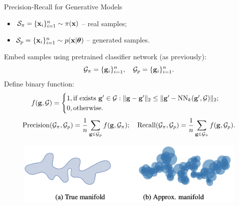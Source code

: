 \begin{frame}{Precision-Recall for Generative Models}
	\begin{itemize}
		\item $\mathcal{S}_{\pi} = \{\mathbf{x}_i\}_{i=1}^{n} \sim \pi(\mathbf{x})$ -- real samples;
		\item $\mathcal{S}_{p} = \{\mathbf{x}_i\}_{i=1}^{n} \sim p(\mathbf{x} | \boldsymbol{\theta})$ -- generated samples.
	\end{itemize}
	Embed samples using pretrained classifier network (as previously):
	\[
		\mathcal{G}_{\pi} = \{\mathbf{g}_i\}_{i=1}^n, \quad \mathcal{G}_{p} = \{\mathbf{g}_i\}_{i=1}^n.
	\]
	Define binary function:
	\[
		f(\mathbf{g}, \mathcal{G}) = 
		\begin{cases}
			1, \text{if exists } \mathbf{g}' \in \mathcal{G}: \| \mathbf{g}  - \mathbf{g}'\|_2 \leq \| \mathbf{g}' - \text{NN}_k(\mathbf{g}', \mathcal{G})\|_2; \\
			0, \text{otherwise.}
		\end{cases}
	\]
	\[
		\text{Precision} (\mathcal{G}_{\pi}, \mathcal{G}_{p}) = \frac{1}{n} \sum_{\mathbf{g} \in \mathcal{G}_{p}} f(\mathbf{g}, \mathcal{G}_{\pi}); \quad \text{Recall} (\mathcal{G}_{\pi}, \mathcal{G}_{p}) = \frac{1}{n} \sum_{\mathbf{g} \in \mathcal{G}_{\pi}} f(\mathbf{g}, \mathcal{G}_{p}).
	\]
	\vspace{-0.4cm}
	\begin{figure}
		\includegraphics[width=0.7\linewidth]{figs/pr_k_nearest}
	\end{figure}
\end{frame}
